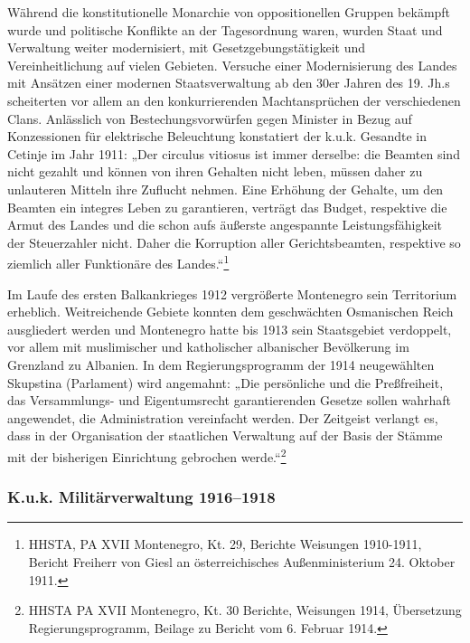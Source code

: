 Während die konstitutionelle Monarchie von oppositionellen Gruppen bekämpft wurde und politische Konflikte an der Tagesordnung waren, wurden Staat und Verwaltung weiter modernisiert, mit Gesetzgebungstätigkeit und Vereinheitlichung auf vielen Gebieten. Versuche einer Modernisierung des Landes mit Ansätzen einer modernen Staatsverwaltung ab den 30er Jahren des 19. Jh.s scheiterten vor allem an den konkurrierenden Machtansprüchen der verschiedenen Clans. Anlässlich von Bestechungsvorwürfen gegen Minister in Bezug auf Konzessionen für elektrische Beleuchtung konstatiert der k.u.k. Gesandte in Cetinje im Jahr 1911: „Der circulus vitiosus ist immer derselbe: die Beamten sind nicht gezahlt und können von ihren Gehalten nicht leben, müssen daher zu unlauteren Mitteln ihre Zuflucht nehmen. Eine Erhöhung der Gehalte, um den Beamten ein integres Leben zu garantieren, verträgt das Budget, respektive die Armut des Landes und die schon aufs äußerste angespannte Leistungsfähigkeit der Steuerzahler nicht. Daher die Korruption aller Gerichtsbeamten, respektive so ziemlich aller Funktionäre des Landes.“\footnote{HHSTA, PA XVII Montenegro, Kt. 29, Berichte Weisungen 1910-1911, Bericht Freiherr von Giesl an österreichisches Außenministerium 24. Oktober 1911.}\par

Im Laufe des ersten Balkankrieges 1912 vergrößerte Montenegro sein Territorium erheblich. Weitreichende Gebiete konnten dem geschwächten Osmanischen Reich ausgliedert werden und Montenegro hatte bis 1913 sein Staatsgebiet verdoppelt, vor allem mit muslimischer und katholischer albanischer Bevölkerung im Grenzland zu Albanien. In dem Regierungsprogramm der 1914 neugewählten Skupstina (Parlament) wird angemahnt: „Die persönliche und die Preßfreiheit, das Versammlungs- und Eigentumsrecht garantierenden Gesetze sollen wahrhaft angewendet, die Administration vereinfacht werden. Der Zeitgeist verlangt es, dass in der Organisation der staatlichen Verwaltung auf der Basis der Stämme mit der bisherigen Einrichtung gebrochen werde.“\footnote{HHSTA PA XVII Montenegro, Kt. 30 Berichte, Weisungen 1914, Übersetzung Regierungsprogramm, Beilage zu Bericht vom 6. Februar 1914.}

\subsubsection{K.u.k. Militärverwaltung 1916–1918}

